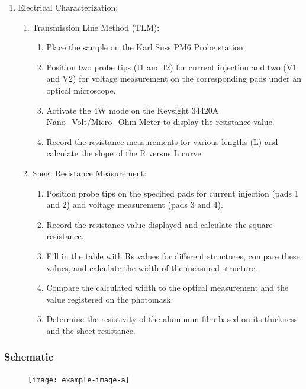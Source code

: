 \documentclass[a4paper, table]{article}
\begin{document}
\begin{enumerate}
    \item Electrical Characterization:
    \begin{enumerate}
        \item Transmission Line Method (TLM):
        \begin{enumerate}
            \item Place the sample on the Karl Suss PM6 Probe station.
            \item Position two probe tips (I1 and I2) for current injection and two (V1 and V2) for voltage measurement on the corresponding pads under an optical microscope.
            \item Activate the 4W mode on the Keysight 34420A Nano\_Volt/Micro\_Ohm Meter to display the resistance value.
            \item Record the resistance measurements for various lengths (L) and calculate the slope of the R versus L curve.
        \end{enumerate}
        
        \item Sheet Resistance Measurement:
        \begin{enumerate}
            \item Position probe tips on the specified pads for current injection (pads 1 and 2) and voltage measurement (pads 3 and 4).
            \item Record the resistance value displayed and calculate the square resistance.
            \item Fill in the table with Rs values for different structures, compare these values, and calculate the width of the measured structure.
            \item Compare the calculated width to the optical measurement and the value registered on the photomask.
            \item Determine the resistivity of the aluminum film based on its thickness and the sheet resistance.
        \end{enumerate}
    \end{enumerate}
\end{enumerate}

\subsubsection{Schematic}
\begin{figure}[h]
\centering
\begin{minipage}{0.5\textwidth}         %
  \centering
  \texttt{[image: example-image-a]}
\end{minipage}
\end{figure}
\end{document}

